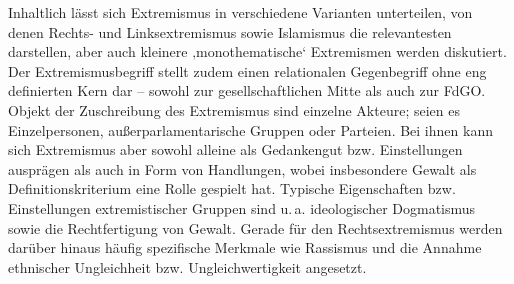 Inhaltlich lässt sich Extremismus in verschiedene Varianten unterteilen, von denen Rechts- und Linksextremismus sowie Islamismus die relevantesten darstellen, aber auch kleinere ‚monothematische` Extremismen werden diskutiert. Der Extremismusbegriff stellt zudem einen relationalen Gegenbegriff ohne eng definierten Kern dar -- sowohl zur gesellschaftlichen Mitte als auch zur FdGO. Objekt der Zuschreibung des Extremismus sind einzelne Akteure; seien es Einzelpersonen, außerparlamentarische Gruppen oder Parteien. Bei ihnen kann sich Extremismus aber sowohl alleine als Gedankengut bzw. Einstellungen ausprägen als auch in Form von Handlungen, wobei insbesondere Gewalt als Definitionskriterium eine Rolle gespielt hat. Typische Eigenschaften bzw. Einstellungen extremistischer Gruppen sind u.\,a. ideologischer Dogmatismus sowie die Rechtfertigung von Gewalt. Gerade für den Rechtsextremismus werden darüber hinaus häufig spezifische Merkmale wie Rassismus und die Annahme ethnischer Ungleichheit bzw. Ungleichwertigkeit angesetzt.
